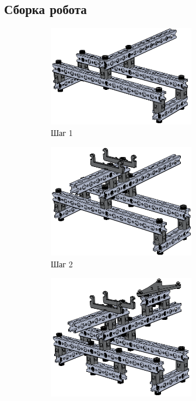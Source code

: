 \subsection{Сборка робота}
\begin{figure}[h]
    \begin{subfigure}[b]{0.45\textwidth}
        \centering
        \includegraphics[width=0.7\textwidth]{fig/assembly/1.1.png}
        \caption*{Шаг 1}
    \end{subfigure}
    \begin{subfigure}[b]{0.45\textwidth}
        \centering
        \includegraphics[width=0.7\textwidth]{fig/assembly/1.2.png}
        \caption*{Шаг 2}
    \end{subfigure}
    \begin{subfigure}[b]{0.45\textwidth}
        \centering
        \includegraphics[width=0.7\textwidth]{fig/assembly/1.3.png}

\end{subfigure}
\end{figure}
